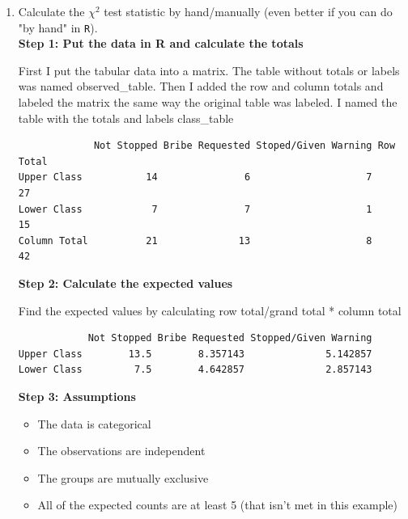 \documentclass[12pt,letterpaper]{article}
\begin{document}
	\begin{enumerate}
		
		\item [(a)]
		Calculate the $\chi^2$ test statistic by hand/manually (even better if you can do "by hand" in \texttt{R}).\\
		
		\noindent \textbf{Step 1: Put the data in R and calculate the totals}
		
		\noindent First I put the tabular data into a matrix. The table without totals or labels was named observed\_table. Then I added the row and column totals and labeled the matrix the same way the original table was labeled. I named the table with the totals and labels class\_table
		
		  
	
	\begin{center}
		\begin{verbatim}
             Not Stopped Bribe Requested Stoped/Given Warning Row Total
Upper Class           14               6                    7        27
Lower Class            7               7                    1        15
Column Total          21              13                    8        42
		\end{verbatim}
	\end{center}
		
		\newpage
		
		\noindent \textbf{Step 2: Calculate the expected values}
		
		\noindent Find the expected values by calculating row total/grand total * column total
		
		  
		
		\begin{verbatim}
            Not Stopped Bribe Requested Stopped/Given Warning
Upper Class        13.5        8.357143              5.142857
Lower Class         7.5        4.642857              2.857143
		\end{verbatim}

	\noindent \textbf{Step 3: Assumptions}
\begin{itemize}
	\item The data is categorical
	\item The observations are independent
	\item The groups are mutually exclusive
	\item All of the expected counts are at least 5 (that isn't met in this example)
\end{itemize}


\end{enumerate}
\end{document}
